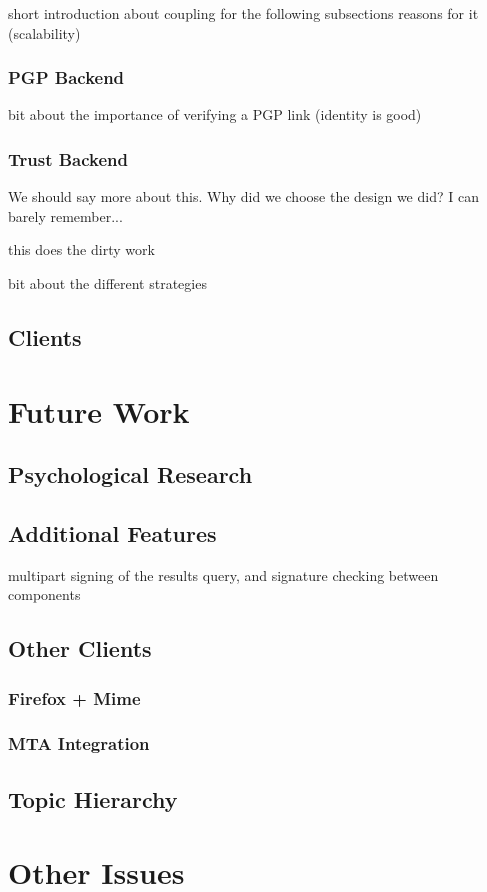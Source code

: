 \documentclass[onecolumn]{acm_proc_article-sp}
\begin{document}
short introduction about coupling for the following subsections
reasons for it (scalability)

\subsubsection{PGP Backend}
bit about the importance of verifying a PGP link (identity is good)

\subsubsection{Trust Backend}
We should say more about this.  Why did we choose the design we did?  I can barely remember...

this does the dirty work

bit about the different strategies

\subsection{Clients}

\section{Future Work}
\subsection{Psychological Research}
\subsection{Additional Features}
multipart signing of the results query, and signature checking between components
\subsection{Other Clients}
\subsubsection{Firefox + Mime}
\subsubsection{MTA Integration}
\subsection{Topic Hierarchy}
\section{Other Issues}
\end{document}
